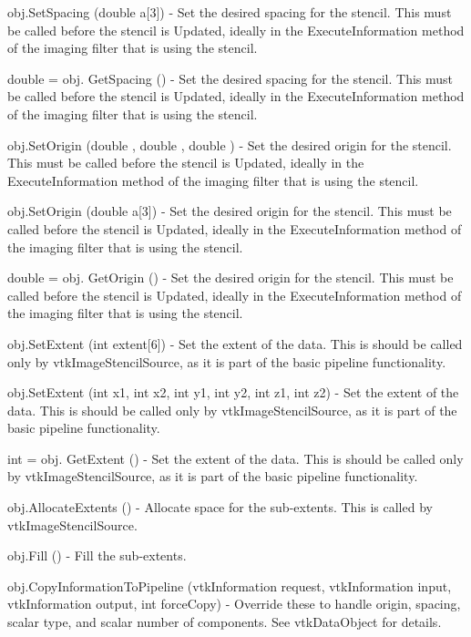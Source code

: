 \begin{DoxyItemize}
\item {\ttfamily obj.\-Set\-Spacing (double a\mbox{[}3\mbox{]})} -\/ Set the desired spacing for the stencil. This must be called before the stencil is Updated, ideally in the Execute\-Information method of the imaging filter that is using the stencil.  
\item {\ttfamily double = obj. Get\-Spacing ()} -\/ Set the desired spacing for the stencil. This must be called before the stencil is Updated, ideally in the Execute\-Information method of the imaging filter that is using the stencil.  
\item {\ttfamily obj.\-Set\-Origin (double , double , double )} -\/ Set the desired origin for the stencil. This must be called before the stencil is Updated, ideally in the Execute\-Information method of the imaging filter that is using the stencil.  
\item {\ttfamily obj.\-Set\-Origin (double a\mbox{[}3\mbox{]})} -\/ Set the desired origin for the stencil. This must be called before the stencil is Updated, ideally in the Execute\-Information method of the imaging filter that is using the stencil.  
\item {\ttfamily double = obj. Get\-Origin ()} -\/ Set the desired origin for the stencil. This must be called before the stencil is Updated, ideally in the Execute\-Information method of the imaging filter that is using the stencil.  
\item {\ttfamily obj.\-Set\-Extent (int extent\mbox{[}6\mbox{]})} -\/ Set the extent of the data. This is should be called only by vtk\-Image\-Stencil\-Source, as it is part of the basic pipeline functionality.  
\item {\ttfamily obj.\-Set\-Extent (int x1, int x2, int y1, int y2, int z1, int z2)} -\/ Set the extent of the data. This is should be called only by vtk\-Image\-Stencil\-Source, as it is part of the basic pipeline functionality.  
\item {\ttfamily int = obj. Get\-Extent ()} -\/ Set the extent of the data. This is should be called only by vtk\-Image\-Stencil\-Source, as it is part of the basic pipeline functionality.  
\item {\ttfamily obj.\-Allocate\-Extents ()} -\/ Allocate space for the sub-\/extents. This is called by vtk\-Image\-Stencil\-Source.  
\item {\ttfamily obj.\-Fill ()} -\/ Fill the sub-\/extents.  
\item {\ttfamily obj.\-Copy\-Information\-To\-Pipeline (vtk\-Information request, vtk\-Information input, vtk\-Information output, int force\-Copy)} -\/ Override these to handle origin, spacing, scalar type, and scalar number of components. See vtk\-Data\-Object for details.  

\end{DoxyItemize}
